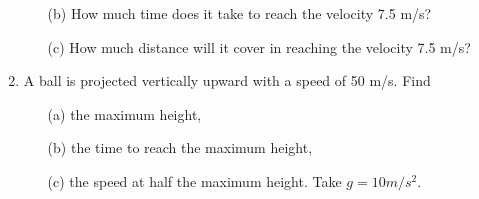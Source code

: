 \documentclass{article}
\begin{document}
\begin{enumerate}
\begin{enumerate}
        \item[(b)] How much time does it take to reach the velocity 7.5 m/s?
        \item[(c)] How much distance will it cover in reaching the velocity 7.5 m/s?
    \end{enumerate}
    \item A ball is projected vertically upward with a speed of 50 m/s. Find 
    \begin{enumerate}
        \item[(a)] the maximum height,
        \item[(b)] the time to reach the maximum height,
        \item[(c)] the speed at half the maximum height. Take \( g = 10 m/s^2 \).
    \end{enumerate}
\end{enumerate}
\end{document}
